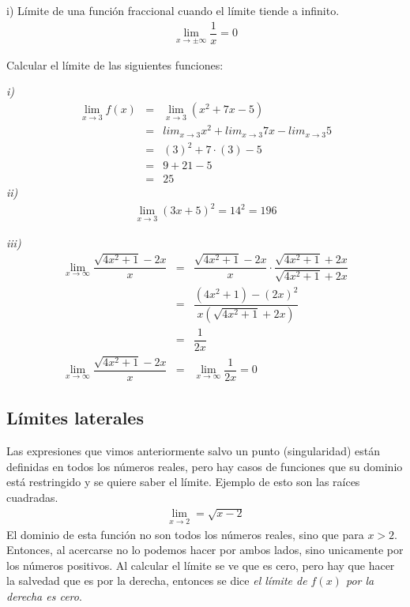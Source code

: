\noindent i) Límite de una función fraccional cuando el límite tiende a infinito. 
\begin{eqnarray}
\lim_{x\rightarrow \pm\infty}\dfrac{1}{x}=0
\end{eqnarray}
\begin{myexample}
Calcular el límite de  las siguientes funciones:
\end{myexample}
\noindent\textit{i)}
\begin{eqnarray*}
\lim_{x\rightarrow 3}f(x)&=&\lim_{x\rightarrow 3}(x^{2}+7x-5)\\
&=&lim_{x\rightarrow 3}x^{2}+lim_{x\rightarrow 3}7x-lim_{x\rightarrow 3}5\\
&=&(3)^{2}+7\cdot (3)-5\\
&=&9+21-5\\
&=&25
\end{eqnarray*}
\noindent\textit{ii)}
\begin{eqnarray*}
\lim_{x\rightarrow 3}(3x+5)^{2}=14^{2}=196
\end{eqnarray*}

\noindent\textit{iii)}
\begin{eqnarray*}
\lim_{x\rightarrow\infty}\dfrac{\sqrt{4x^{2}+1}-2x}{x}&=&\dfrac{\sqrt{4x^{2}+1}-2x}{x} \cdot \dfrac{\sqrt{4x^{2}+1}+2x}{\sqrt{4x^{2}+1}+2x}\\
&=& \dfrac{(4x^{2}+1)-(2x)^{2}}{x(\sqrt{4x^{2}+1}+2x)}\\
&=&\dfrac{1}{2x}\\
\lim_{x\rightarrow\infty}\dfrac{\sqrt{4x^{2}+1}-2x}{x}&=&\lim_{x\rightarrow\infty}\dfrac{1}{2x}=0
\end{eqnarray*}

\subsection{Límites laterales}

Las expresiones que vimos anteriormente salvo un punto (singularidad) están definidas en todos los números reales, pero hay casos de funciones que su dominio está restringido y se quiere saber el límite. Ejemplo de esto son las raíces cuadradas.
\begin{eqnarray}
\lim_{x\rightarrow 2}=\sqrt{x-2}
\end{eqnarray}
El dominio de esta función no son todos los números reales, sino que para $x>2$. Entonces, al acercarse no lo podemos hacer por ambos lados, sino unicamente por los números positivos. Al calcular el límite se ve que es cero, pero hay que hacer la salvedad que es por la derecha, entonces se dice \textit{el límite de $f(x)$ por la derecha es cero}.

